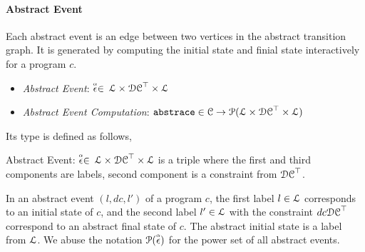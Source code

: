  \paragraph{Abstract Event} Each abstract event is an edge between two vertices in the abstract transition graph.
 It is generated by computing the initial state and finial state interactively for a program $c$.
 
 \begin{itemize}
  \item \emph{Abstract Event}: 
  $\stackrel{\scriptscriptstyle{\alpha}}{\mathtt{\epsilon}{}} \in $
  $\mathcal{L} \times \mathcal{DC}^{\top} \times \mathcal{L}$
  \item \emph{Abstract Event Computation}: $\mathtt{abs}{\mathtt{trace}} \in \mathcal{C} \to \mathcal{P}( \mathcal{L} \times \mathcal{DC}^{\top} \times \mathcal{L} )$
 \end{itemize}
 Its type is defined as follows,
 \begin{defn}
   \label{def:abs_event}
   Abstract Event: 
   $\stackrel{\scriptscriptstyle{\alpha}}{\mathtt{\epsilon}{}} \in $
   $\mathcal{L} \times \mathcal{DC}^{\top} \times \mathcal{L}$
   is a 
   triple where the first and third components are labels,
   second component is a constraint from $\mathcal{DC}^{\top}$.
   \end{defn}
   In an abstract event $(l, dc, l')$ of a program $c$, 
   the first label $l \in \mathcal{L}$ corresponds to an initial state of $c$, and 
   the second label $l' \in \mathcal{L}$ with the constraint $dc\mathcal{DC}^{\top}$ correspond to an abstract final state of $c$.
  The abstract initial state is a label from $\mathcal{L}$.
We abuse the notation $\mathcal{P}(\stackrel{\scriptscriptstyle{\alpha}}{\mathtt{\epsilon}{}})$ for the power set of all abstract events.

